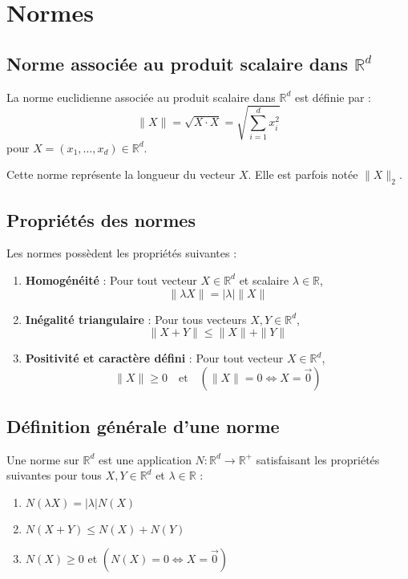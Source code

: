 \section{Normes}

\subsection{Norme associée au produit scalaire dans $\mathbb{R}^d$}

\begin{definition}
La norme euclidienne associée au produit scalaire dans $\mathbb{R}^d$ est définie par :
\[
\|X\| = \sqrt{X \cdot X} = \sqrt{\sum_{i=1}^d x_i^2}
\]
pour $X = (x_1, \ldots, x_d) \in \mathbb{R}^d$.
\end{definition}
Cette norme représente la longueur du vecteur $X$. Elle est parfois notée $\|X\|_2$.

\subsection{Propriétés des normes}

Les normes possèdent les propriétés suivantes :

\begin{enumerate}
    \item \textbf{Homogénéité} : Pour tout vecteur $X \in \mathbb{R}^d$ et scalaire $\lambda \in \mathbb{R}$,
    \[
    \|\lambda X\| = |\lambda| \|X\|
    \]
    \item \textbf{Inégalité triangulaire} : Pour tous vecteurs $X, Y \in \mathbb{R}^d$,
    \[
    \|X + Y\| \leq \|X\| + \|Y\|
    \]
    \item \textbf{Positivité et caractère défini} : Pour tout vecteur $X \in \mathbb{R}^d$,
    \[
    \|X\| \geq 0 \quad \text{et} \quad (\|X\| = 0 \iff X = \overrightarrow{0})
    \]
\end{enumerate}

\subsection{Définition générale d'une norme}

\begin{definition}
Une norme sur $\mathbb{R}^d$ est une application $N : \mathbb{R}^d \to \mathbb{R}^+$ satisfaisant les propriétés suivantes pour tous $X, Y \in \mathbb{R}^d$ et $\lambda \in \mathbb{R}$ :
\begin{enumerate}
    \item $N(\lambda X) = |\lambda| N(X)$
    \item $N(X + Y) \leq N(X) + N(Y)$
    \item $N(X) \geq 0$ et $(N(X) = 0 \iff X = \overrightarrow{0})$
\end{enumerate}
\end{definition}

